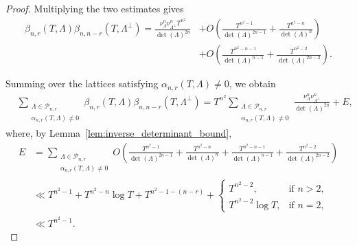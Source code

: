 \documentclass[11pt,reqno]{amsart}
\theoremstyle{definition}
\theoremstyle{remark}
\numberwithin{equation}{section}
\numberwithin{thm}{section}
\numberwithin{table}{section}
\begin{document}
\begin{proof}
Multiplying the two estimates gives
\begin{align*}
 \beta_{n,r}(T,\Lambda)
 \beta_{n,n-r}(T,\Lambda^\perp)
 =
 \frac{\nu_{\Lambda}^n\nu_{\Lambda^\perp}^nT^{n^2}}
 {\det(\Lambda)^{2n}}
 &+ O\left(
 \frac{T^{n^2-1}}{\det(\Lambda)^{2n-1}} +
 \frac{T^{n^2-n}}{\det(\Lambda)^n}
 \right)\\
 &+ O\left(
 \frac{T^{n^2-n-1}}{\det(\Lambda)^{n-1}} +
 \frac{T^{n^2-2}}{\det(\Lambda)^{2n-2}}
 \right).
\end{align*}

Summing over the lattices satisfying
$\alpha_{n,r}(T,\Lambda)\neq0$, we obtain
\begin{align*}
 &\sum_{\substack{\Lambda\in\mathcal{P}_{n,r}\\
 \alpha_{n,r}(T,\Lambda)\neq0}}
 \beta_{n,r}(T,\Lambda)
 \beta_{n,n-r}(T,\Lambda^\perp) =
 T^{n^2}
 \sum_{\substack{\Lambda\in\mathcal{P}_{n,r}\\
 \alpha_{n,r}(T,\Lambda)\neq0}}
 \frac{\nu_{\Lambda}^n\nu_{\Lambda^\perp}^n}
 {\det(\Lambda)^{2n}}
 +E,
\end{align*}
where, by Lemma~\ref{lem:inverse_determinant_bound},
\begin{align*}
 E
 &=
 \sum_{\substack{\Lambda\in\mathcal{P}_{n,r}\\
 \alpha_{n,r}(T,\Lambda)\neq0}}
 O\left(
 \frac{T^{n^2-1}}{\det(\Lambda)^{2n-1}} +
 \frac{T^{n^2-n}}{\det(\Lambda)^n}
 +
 \frac{T^{n^2-n-1}}{\det(\Lambda)^{n-1}} +
 \frac{T^{n^2-2}}{\det(\Lambda)^{2n-2}}
 \right)\\
 &\ll
 T^{n^2-1}
 +T^{n^2-n}\log T
 +T^{n^2-1-(n-r)}
 +\begin{cases}
     T^{n^2-2}, & \text{if } n>2,\\
     T^{n^2-2}\log T, & \text{if } n=2,
 \end{cases}\\
 &\ll T^{n^2-1}.
\end{align*}


\end{proof}
\end{document}
